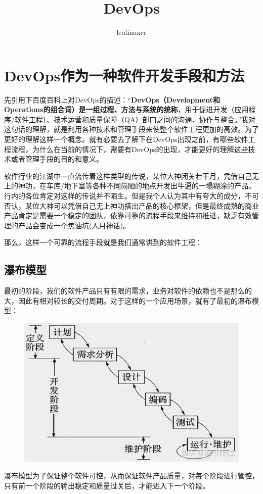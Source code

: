 \documentclass[12pt]{article}
\title{DevOps\cite{Thinking_DevOps}\cite{DevOps_Meaning}}
\author{leolinuxer}
\begin{document}
\maketitle
\tableofcontents

\section{DevOps作为一种软件开发手段和方法}
先引用下百度百科上对DevOps的描述：“\textbf{DevOps（Development和Operations的组合词）是一组过程、方法与系统的统称}，用于促进开发（应用程序/软件工程）、技术运营和质量保障（QA）部门之间的沟通、协作与整合。”我对这句话的理解，就是利用各种技术和管理手段来使整个软件工程更加的高效。为了更好的理解这样一个概念。就有必要去了解下在DevOps出现之前，有哪些软件工程流程，为什么在当前的情况下，需要有DevOps的出现，才能更好的理解这些技术或者管理手段的目的和意义。

软件行业的江湖中一直流传着这样类型的传说，某位大神闭关若干月，凭借自己无上的神功，在车库/地下室等各种不同简陋的地点开发出牛逼的一塌糊涂的产品。行内的各位肯定对这样的传说并不陌生。但是我个人认为其中有夸大的成分，不可否认，某位大神可以凭借自己无上神功搭出产品的核心框架，但是最终成熟的商业产品肯定是需要一个稳定的团队，依靠可靠的流程手段来维持和推进，缺乏有效管理的产品会变成一个焦油坑(人月神话)。

那么，这样一个可靠的流程手段就是我们通常讲到的软件工程：

\subsection{瀑布模型}
最初的阶段，我们的软件产品只有有限的需求，业务对软件的依赖也不是那么的大，因此有相对较长的交付周期。对于这样的一个应用场景，就有了最初的瀑布模型：
\begin{figure}[H]
    \centering
    \includegraphics[width=.6\textwidth]{fig/DevOps_WaterFall.png}
\end{figure}

瀑布模型为了保证整个软件可控，从而保证软件产品质量，对每个阶段进行管控，只有前一个阶段的输出稳定和质量过关后，才能进入下一个阶段。
\end{document}
